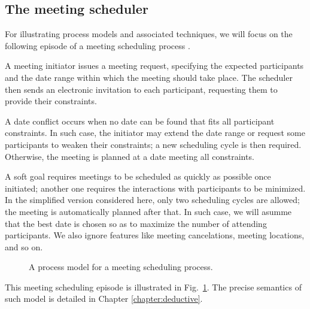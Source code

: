 \subsection{The meeting scheduler\label{subsection:background-meeting-scheduler}}

For illustrating process models and associated techniques, we will focus on the following episode of a meeting scheduling process \cite{Feather:1997}. 

A meeting initiator issues a meeting request, specifying the expected participants and the date range within which the meeting should take place. The scheduler then sends an electronic invitation to each participant, requesting them to provide their constraints. 

A date conflict occurs when no date can be found that fits all participant constraints. In such case, the initiator may extend the date range or request some participants to weaken their constraints; a new scheduling cycle is then required. Otherwise, the meeting is planned at a date meeting all constraints.

A soft goal requires meetings to be scheduled as quickly as possible once initiated; another one requires the interactions with participants to be minimized. In the simplified version considered here, only two scheduling cycles are allowed; the meeting is automatically planned after that. In such case, we will asumme that the best date is chosen so as to maximize the number of attending participants. We also ignore features like meeting cancelations, meeting locations, and so on.

\begin{figure}[H]\centering
{}
\caption{A process model for a meeting scheduling process.\label{image:scheduler-ghmsc}}
\end{figure}

This meeting scheduling episode is illustrated in Fig.~\ref{image:scheduler-ghmsc}. The precise semantics of such model is detailed in Chapter \ref{chapter:deductive}.

